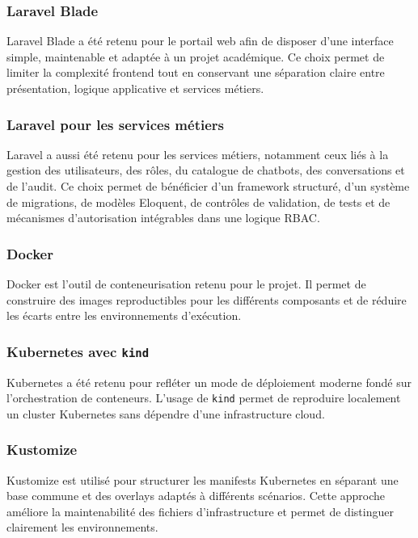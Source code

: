 \subsubsection{Laravel Blade}

Laravel Blade a été retenu pour le portail web afin de disposer d’une interface simple, maintenable et adaptée à un projet académique. Ce choix permet de limiter la complexité frontend tout en conservant une séparation claire entre présentation, logique applicative et services métiers.

\subsubsection{Laravel pour les services métiers}

Laravel a aussi été retenu pour les services métiers, notamment ceux liés à la gestion des utilisateurs, des rôles, du catalogue de chatbots, des conversations et de l’audit. Ce choix permet de bénéficier d’un framework structuré, d’un système de migrations, de modèles Eloquent, de contrôles de validation, de tests et de mécanismes d’autorisation intégrables dans une logique RBAC.

\subsubsection{Docker}

Docker est l'outil de conteneurisation retenu pour le projet. Il permet de construire des images reproductibles pour les différents composants et de réduire les écarts entre les environnements d’exécution.

\subsubsection{Kubernetes avec \texttt{kind}}

Kubernetes a été retenu pour refléter un mode de déploiement moderne fondé sur l’orchestration de conteneurs. L’usage de \texttt{kind} permet de reproduire localement un cluster Kubernetes sans dépendre d’une infrastructure cloud.

\subsubsection{Kustomize}

Kustomize est utilisé pour structurer les manifests Kubernetes en séparant une base commune et des overlays adaptés à différents scénarios. Cette approche améliore la maintenabilité des fichiers d’infrastructure et permet de distinguer clairement les environnements.

